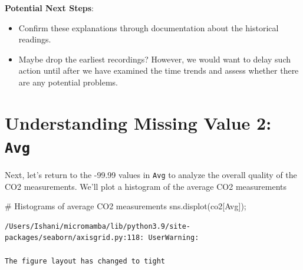 \documentclass[
  letterpaper,
  DIV=11,
  numbers=noendperiod]{scrreprt}
\newenvironment{Shaded}{\begin{snugshade}}{\end{snugshade}}
\newcommand{\CommentTok}[1]{\textcolor[rgb]{0.37,0.37,0.37}{#1}}
\newcommand{\NormalTok}[1]{\textcolor[rgb]{0.00,0.23,0.31}{#1}}
\newcommand{\OperatorTok}[1]{\textcolor[rgb]{0.37,0.37,0.37}{#1}}
\newcommand{\StringTok}[1]{\textcolor[rgb]{0.13,0.47,0.30}{#1}}
\providecommand{\tightlist}{%
  \setlength{\itemsep}{0pt}\setlength{\parskip}{0pt}}\usepackage{longtable,booktabs,array}
\begin{document}
\textbf{Potential Next Steps}:

\begin{itemize}
\tightlist
\item
  Confirm these explanations through documentation about the historical
  readings.
\item
  Maybe drop the earliest recordings? However, we would want to delay
  such action until after we have examined the time trends and assess
  whether there are any potential problems.
\end{itemize}

\hypertarget{understanding-missing-value-2-avg}{%
\section{\texorpdfstring{Understanding Missing Value 2:
\texttt{Avg}}{Understanding Missing Value 2: Avg}}\label{understanding-missing-value-2-avg}}

Next, let's return to the -99.99 values in \texttt{Avg} to analyze the
overall quality of the CO2 measurements. We'll plot a histogram of the
average CO2 measurements

\begin{Shaded}
\begin{Highlighting}[]
\CommentTok{\# Histograms of average CO2 measurements}
\NormalTok{sns.displot(co2[}\StringTok{\textquotesingle{}Avg\textquotesingle{}}\NormalTok{])}\OperatorTok{;}
\end{Highlighting}
\end{Shaded}

\begin{verbatim}
/Users/Ishani/micromamba/lib/python3.9/site-packages/seaborn/axisgrid.py:118: UserWarning:

The figure layout has changed to tight
\end{verbatim}
\end{document}
